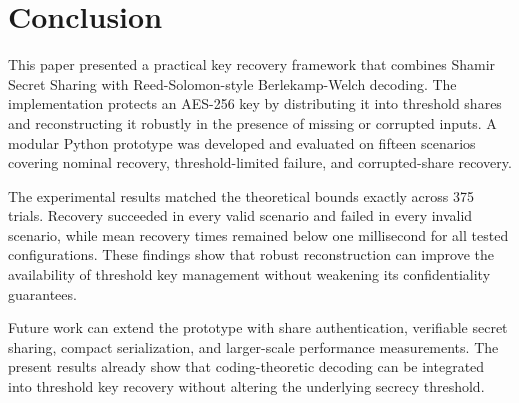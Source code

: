 \section{Conclusion}

This paper presented a practical key recovery framework that combines Shamir Secret Sharing with Reed-Solomon-style Berlekamp-Welch decoding. The implementation protects an AES-256 key by distributing it into threshold shares and reconstructing it robustly in the presence of missing or corrupted inputs. A modular Python prototype was developed and evaluated on fifteen scenarios covering nominal recovery, threshold-limited failure, and corrupted-share recovery.

The experimental results matched the theoretical bounds exactly across 375 trials. Recovery succeeded in every valid scenario and failed in every invalid scenario, while mean recovery times remained below one millisecond for all tested configurations. These findings show that robust reconstruction can improve the availability of threshold key management without weakening its confidentiality guarantees.

Future work can extend the prototype with share authentication, verifiable secret sharing, compact serialization, and larger-scale performance measurements. The present results already show that coding-theoretic decoding can be integrated into threshold key recovery without altering the underlying secrecy threshold.
